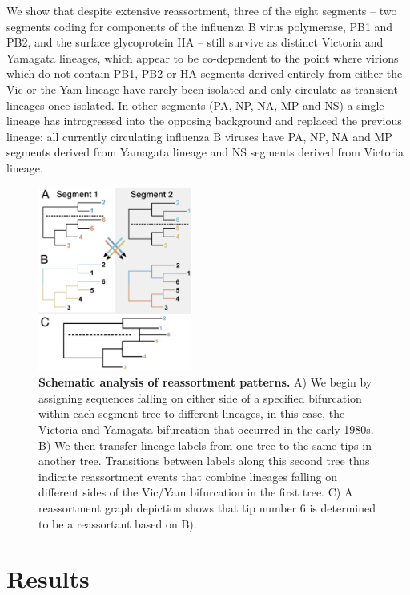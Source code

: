 \documentclass[11pt,oneside,letterpaper]{article}
\begin{document}
We show that despite extensive reassortment, three of the eight segments -- two segments coding for components of the influenza B virus polymerase, PB1 and PB2, and the surface glycoprotein HA -- still survive as distinct Victoria and Yamagata lineages, which appear to be co-dependent to the point where virions which do not contain PB1, PB2 or HA segments derived entirely from either the Vic or the Yam lineage have rarely been isolated and only circulate as transient lineages once isolated.
In other segments (PA, NP, NA, MP and NS) a single lineage has introgressed into the opposing background and replaced the previous lineage: all currently circulating influenza B viruses have PA, NP, NA and MP segments derived from Yamagata lineage and NS segments derived from Victoria lineage.

\begin{figure}[h]
 \centering		
	\includegraphics[width=0.45\textwidth]{figures/TreeFigure2.png}
	\caption{\textbf{Schematic analysis of reassortment patterns.}
	A) We begin by assigning sequences falling on either side of a specified bifurcation within each segment tree to different lineages, in this case, the Victoria and Yamagata bifurcation that occurred in the early 1980s.
	B) We then transfer lineage labels from one tree to the same tips in another tree.
	Transitions between labels along this second tree thus indicate reassortment events that combine lineages falling on different sides of the Vic/Yam bifurcation in the first tree.
	C) A reassortment graph depiction shows that tip number 6 is determined to be a reassortant based on B).
	}
	\label{methodFig}
\end{figure}

\section*{Results}
\end{document}
